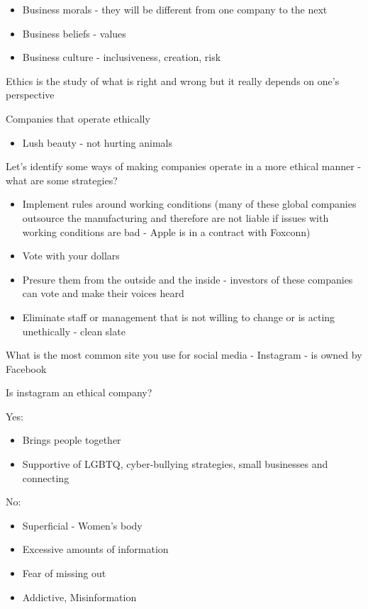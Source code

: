 \documentclass[11pt]{article}
\begin{document}
\begin{itemize}
    \item Business morals - they will be different from one company to the next
    \item Business beliefs - values
    \item Business culture - inclusiveness, creation, risk
\end{itemize}

Ethics is the study of what is right and wrong but it really depends on one's perspective

Companies that operate ethically
\begin{itemize}
    \item Lush beauty - not hurting animals
\end{itemize}


Let's identify some ways of making companies operate in a more ethical manner - what are some strategies?
\begin{itemize}
    \item Implement rules around working conditions (many of these global companies outsource the manufacturing and therefore are not liable if issues with working conditions are bad - Apple is in a contract with Foxconn)
    \item Vote with your dollars
    \item Presure them from the outside and the inside - investors of these companies can vote and make their voices heard
    \item Eliminate staff or management that is not willing to change or is acting unethically - clean slate
\end{itemize}

What is the most common site you use for social media - Instagram - is owned by Facebook

Is instagram an ethical company?

Yes:
\begin{itemize}
    \item Brings people together
    \item Supportive of LGBTQ, cyber-bullying strategies, small businesses and connecting
\end{itemize}

No:
\begin{itemize}
    \item Superficial - Women's body
    \item Excessive amounts of information
    \item Fear of missing out
    \item Addictive, Misinformation
\end{itemize}
\end{document}
